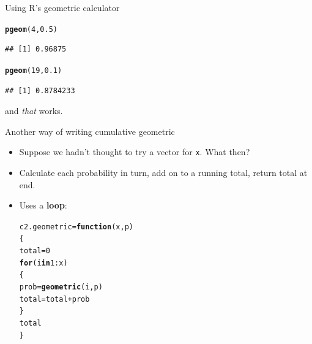 \documentclass[unknownkeysallowed]{beamer}\usepackage[]{graphicx}\usepackage[]{color}
\makeatletter
\newcommand{\hlnum}[1]{\textcolor[rgb]{0.686,0.059,0.569}{#1}}%
\newcommand{\hlopt}[1]{\textcolor[rgb]{0,0,0}{#1}}%
\newcommand{\hlstd}[1]{\textcolor[rgb]{0.345,0.345,0.345}{#1}}%
\newcommand{\hlkwa}[1]{\textcolor[rgb]{0.161,0.373,0.58}{\textbf{#1}}}%
\newcommand{\hlkwb}[1]{\textcolor[rgb]{0.69,0.353,0.396}{#1}}%
\newcommand{\hlkwc}[1]{\textcolor[rgb]{0.333,0.667,0.333}{#1}}%
\newcommand{\hlkwd}[1]{\textcolor[rgb]{0.737,0.353,0.396}{\textbf{#1}}}%
\newenvironment{kframe}{%
 \def\at@end@of@kframe{}%
 \ifinner\ifhmode%
  \def\at@end@of@kframe{\end{minipage}}%
  \begin{minipage}{\columnwidth}%
 \fi\fi%
 \def\FrameCommand##1{\hskip\@totalleftmargin \hskip-\fboxsep
 \colorbox{shadecolor}{##1}\hskip-\fboxsep
     \hskip-\linewidth \hskip-\@totalleftmargin \hskip\columnwidth}%
 \MakeFramed {\advance\hsize-\width
   \@totalleftmargin\z@ \linewidth\hsize
   \@setminipage}}%
 {\par\unskip\endMakeFramed%
 \at@end@of@kframe}
\newenvironment{knitrout}{}{} %
\makeatother
\begin{document}
\begin{frame}[fragile]{Using R's geometric calculator}
\begin{itemize}
  \begin{footnotesize}
\begin{multicols}{2}
\begin{knitrout}
\color{fgcolor}\begin{kframe}
\begin{alltt}
\hlkwd{pgeom}\hlstd{(}\hlnum{4}\hlstd{,}\hlnum{0.5}\hlstd{)}
\end{alltt}
\begin{verbatim}
## [1] 0.96875
\end{verbatim}
\end{kframe}
\end{knitrout}
\begin{knitrout}
\color{fgcolor}\begin{kframe}
\begin{alltt}
\hlkwd{pgeom}\hlstd{(}\hlnum{19}\hlstd{,}\hlnum{0.1}\hlstd{)}
\end{alltt}
\begin{verbatim}
## [1] 0.8784233
\end{verbatim}
\end{kframe}
\end{knitrout}
\end{multicols}
  \end{footnotesize}
and \emph{that} works.

  \end{itemize}
  
\end{frame}

\begin{frame}[fragile]{Another way of writing cumulative geometric}

  \begin{itemize}
  \item Suppose we hadn't thought to try a vector for \texttt{x}. What then?
  \item Calculate each probability in turn, add on to a running total,
    return total at end.
  \item Uses a \textbf{loop}:
\begin{knitrout}
\color{fgcolor}\begin{kframe}
\begin{alltt}
\hlstd{c2.geometric}\hlkwb{=}\hlkwa{function}\hlstd{(}\hlkwc{x}\hlstd{,}\hlkwc{p}\hlstd{)}
  \hlstd{\{}
    \hlstd{total}\hlkwb{=}\hlnum{0}
    \hlkwa{for} \hlstd{(i} \hlkwa{in} \hlnum{1}\hlopt{:}\hlstd{x)}
      \hlstd{\{}
        \hlstd{prob}\hlkwb{=}\hlkwd{geometric}\hlstd{(i,p)}
        \hlstd{total}\hlkwb{=}\hlstd{total}\hlopt{+}\hlstd{prob}
      \hlstd{\}}
    \hlstd{total}
  \hlstd{\}}
\end{alltt}
\end{kframe}
\end{knitrout}
  \end{itemize}
  
\end{frame}
\end{document}

